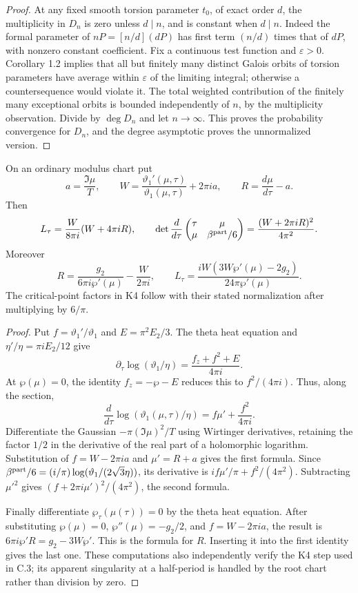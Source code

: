 \begin{proof}
At any fixed smooth torsion parameter $t_0$, of exact order
$d$, the multiplicity in $D_n$ is zero unless $d\mid n$,
and is constant when $d\mid n$. Indeed the formal parameter
of $nP=[n/d](dP)$ has first term $(n/d)$ times that of $dP$,
with nonzero constant coefficient. Fix a continuous test
function and $\varepsilon>0$. Corollary 1.2 implies that
all but finitely many distinct Galois orbits of torsion
parameters have average within $\varepsilon$ of the limiting
integral; otherwise a countersequence would violate it.
The total weighted contribution of the finitely many
exceptional orbits is bounded independently of $n$, by
the multiplicity observation. Divide by $\deg D_n$ and
let $n\to\infty$. This proves the probability convergence
for $D_n$, and the degree asymptotic proves the unnormalized
version.
\end{proof}

\begin{statement}
On an ordinary modulus chart put
\[
 a=\frac{\Im\mu}{T},\qquad
 W=\frac{\vartheta_1'(\mu,\tau)}{\vartheta_1(\mu,\tau)}
                         +2\pi ia,\qquad
 R=\frac{d\mu}{d\tau}-a.
\]
Then
\[
 L_\tau=\frac{W}{8\pi i}(W+4\pi iR),\qquad
 \det\frac{d}{d\tau}
 \begin{pmatrix}\tau&\mu\\\mu&\beta^{\rm part}/6\end{pmatrix}
       =\frac{(W+2\pi iR)^2}{4\pi^2}.
\]
Moreover
\[
 R=\frac{g_2}{6\pi i\wp'(\mu)}-\frac{W}{2\pi i},
 \qquad
 L_\tau=\frac{iW(3W\wp'(\mu)-2g_2)}
                         {24\pi\wp'(\mu)}.
\]
The critical-point factors in K4 follow with their stated
normalization after multiplying by $6/\pi$.
\end{statement}
\begin{proof}
Put $f=\vartheta_1'/\vartheta_1$ and
$E=\pi^2E_2/3$. The theta heat equation and
$\eta'/\eta=\pi iE_2/12$ give
\[
 \partial_\tau\log(\vartheta_1/\eta)
       =\frac{f_z+f^2+E}{4\pi i}.
\]
At $\wp(\mu)=0$, the identity $f_z=-\wp-E$ reduces
this to $f^2/(4\pi i)$. Thus, along the section,
\[
 \frac{d}{d\tau}\log(\vartheta_1(\mu,\tau)/\eta)
       =f\mu'+\frac{f^2}{4\pi i}.
\]
Differentiate the Gaussian $-\pi(\Im\mu)^2/T$ using
Wirtinger derivatives, retaining the factor $1/2$ in
the derivative of the real part of a holomorphic logarithm.
Substitution of $f=W-2\pi ia$ and $\mu'=R+a$ gives the
first formula. Since
$\beta^{\rm part}/6=(i/\pi)\log(\vartheta_1/(2\sqrt3\eta))$,
its derivative is $if\mu'/\pi+f^2/(4\pi^2)$.
Subtracting $\mu'^2$ gives
$(f+2\pi i\mu')^2/(4\pi^2)$, the second formula.

Finally differentiate $\wp_\tau(\mu(\tau))=0$ by the theta
heat equation. After substituting $\wp(\mu)=0$,
$\wp''(\mu)=-g_2/2$, and $f=W-2\pi ia$, the result is
$6\pi i\wp'R=g_2-3W\wp'$. This is the formula for $R$.
Inserting it into the first identity gives the last one.
These computations also independently verify the K4 step
used in C.3; its apparent singularity at a half-period is
handled by the root chart rather than division by zero.
\end{proof}

